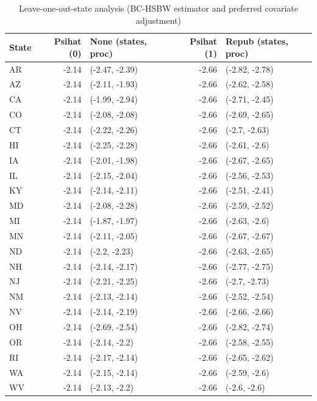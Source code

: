 \documentclass[12pt]{article}
\begin{document}
\begin{table}[ht]
\begin{tabular}{lrlrl}
  \toprule
State & Psihat (0) & None (states, proc) & Psihat (1) & Repub (states, proc) \\ 
  \midrule
AR & -2.14 & (-2.47, -2.39) & -2.66 & (-2.82, -2.78) \\ 
  AZ & -2.14 & (-2.11, -1.93) & -2.66 & (-2.62, -2.58) \\ 
  CA & -2.14 & (-1.99, -2.94) & -2.66 & (-2.71, -2.45) \\ 
  CO & -2.14 & (-2.08, -2.08) & -2.66 & (-2.69, -2.65) \\ 
  CT & -2.14 & (-2.22, -2.26) & -2.66 & (-2.7, -2.63) \\ 
  HI & -2.14 & (-2.25, -2.28) & -2.66 & (-2.61, -2.6) \\ 
  IA & -2.14 & (-2.01, -1.98) & -2.66 & (-2.67, -2.65) \\ 
  IL & -2.14 & (-2.15, -2.04) & -2.66 & (-2.56, -2.53) \\ 
  KY & -2.14 & (-2.14, -2.11) & -2.66 & (-2.51, -2.41) \\ 
  MD & -2.14 & (-2.08, -2.28) & -2.66 & (-2.59, -2.52) \\ 
  MI & -2.14 & (-1.87, -1.97) & -2.66 & (-2.63, -2.6) \\ 
  MN & -2.14 & (-2.11, -2.05) & -2.66 & (-2.67, -2.67) \\ 
  ND & -2.14 & (-2.2, -2.23) & -2.66 & (-2.63, -2.65) \\ 
  NH & -2.14 & (-2.14, -2.17) & -2.66 & (-2.77, -2.75) \\ 
  NJ & -2.14 & (-2.21, -2.25) & -2.66 & (-2.7, -2.73) \\ 
  NM & -2.14 & (-2.13, -2.14) & -2.66 & (-2.52, -2.54) \\ 
  NV & -2.14 & (-2.14, -2.19) & -2.66 & (-2.66, -2.66) \\ 
  OH & -2.14 & (-2.69, -2.54) & -2.66 & (-2.82, -2.74) \\ 
  OR & -2.14 & (-2.14, -2.2) & -2.66 & (-2.58, -2.55) \\ 
  RI & -2.14 & (-2.17, -2.14) & -2.66 & (-2.65, -2.62) \\ 
  WA & -2.14 & (-2.15, -2.14) & -2.66 & (-2.59, -2.6) \\ 
  WV & -2.14 & (-2.13, -2.2) & -2.66 & (-2.6, -2.6) \\ 
   \bottomrule
\end{tabular}
   \label{sensitivityc1}
   \caption{Leave-one-out-state analysis (BC-HSBW estimator and preferred covariate adjustment)}
\end{table}
\end{document}
